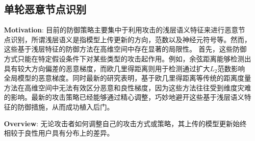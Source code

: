 \documentclass[lettersize,journal]{IEEEtran}
\begin{document}
\subsection{单轮恶意节点识别}
\textbf{Motivation}: 目前的防御策略主要集中于利用攻击的浅层语义特征来进行恶意节点识别，所谓浅层语义是指模型上传更新的方向，范数以及神经元符号等。然而，这些基于浅层特征的防御方法在高维空间中存在显著的局限性。
首先，这些防御方式只能在特定假设条件下对某些类型的攻击起作用。例如，余弦距离能够检测出具有较大方向偏差的恶意梯度，而欧几里得距离则用于检测通过扩大$L_2$范数影响全局模型的恶意梯度。同时最新的研究表明，基于欧几里得距离等传统的距离度量方法在高维空间中无法有效区分恶意和良性梯度，因为这些方法往往受到维度灾难的影响。最新的攻击策略已经能够通过精心调整，巧妙地避开这些基于浅层语义特征的防御措施，从而成功植入后门。

\textbf{Overview}: 无论攻击者如何调整自己的攻击方式或策略，其上传的模型更新始终相较于良性用户具有分布上的差异。%
\end{document}

